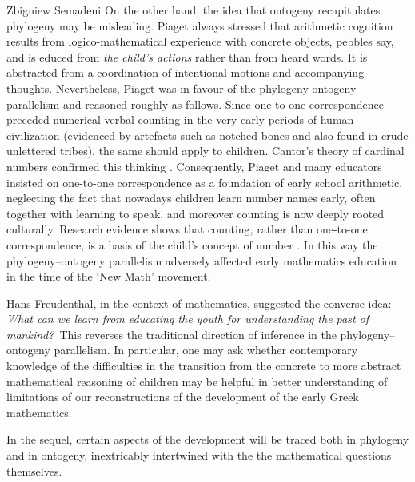 \begin{artengenv}{Zbigniew Semadeni}
On the other hand, the idea that ontogeny recapitulates phylogeny may be misleading. 
Piaget always stressed that arithmetic cognition results from logico-mathematical 
experience with concrete objects, pebbles say, and is educed from \textit{the 
child’s actions} rather than from heard words. It is abstracted from a coordination of 
intentional motions and accompanying thoughts. Nevertheless, Piaget was in favour 
of the phylogeny-ontogeny parallelism and reasoned roughly as follows. Since 
one-to-one correspondence preceded numerical verbal counting in the very early 
periods of human civilization (evidenced by artefacts such as notched bones and 
also found in crude unlettered tribes), the same should apply to children. Cantor’s 
theory of cardinal numbers confirmed this thinking \parencite[pp.259--260]{B-P}.
Consequently, Piaget and many educators insisted on one-to-one correspondence 
as a foundation of early school arithmetic, neglecting the fact that nowadays 
children learn number names early, often together with learning to speak, and 
moreover counting is now deeply rooted culturally. Research evidence shows that 
counting, rather than one-to-one correspondence, is a basis of the child’s 
concept of number \parencite[pp.77--82]{G-G}.
In this way the phylogeny–ontogeny parallelism adversely affected early mathematics 
education in the time of the `New Math' movement. 

Hans Freudenthal, in the context of mathematics, suggested the converse idea: 
\textit{What can we learn from educating the youth for understanding the past of 
mankind?} \,This reverses the traditional direction of inference in the 
phylogeny–ontogeny parallelism. In particular, one may ask whether contemporary 
knowledge of the difficulties in the transition from the concrete to more abstract 
mathematical reasoning of children may be helpful in better understanding of 
limitations of our reconstructions of the development of the early Greek mathematics.  

In the sequel, certain aspects of the development will be traced both in phylogeny 
and in ontogeny, inextricably %
intertwined with the the mathematical questions themselves. 


\end{artengenv}
